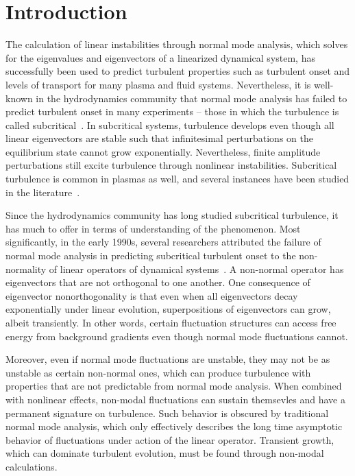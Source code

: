 \documentclass[twocolumn,showkeys,superscriptaddress]{revtex4}
\begin{document}
\section{Introduction}

The calculation of linear instabilities through normal mode analysis, which solves for the eigenvalues and eigenvectors of a linearized dynamical system,
has successfully been used to predict turbulent properties such as turbulent onset and levels of transport for many plasma and fluid systems.
Nevertheless, it is well-known in the hydrodynamics community that normal mode analysis has failed to predict turbulent onset in many experiments -- those in which the
turbulence is called subcritical~\cite{drazin1981}. 
In subcritical systems, turbulence develops even though all linear eigenvectors are stable such that infinitesimal perturbations on the equilibrium state cannot grow exponentially. 
Nevertheless, finite amplitude perturbations still excite turbulence through nonlinear instabilities.
Subcritical turbulence is common in plasmas as well, and several instances have been studied in the literature~\cite{waltz1985,scott1990,nordman1993,biskamp1995,drake1995,itoh1996,camargo1998,krommes1999,camporeale2009,schekochihin2012,highcock2012}. 

Since the hydrodynamics community has long studied subcritical turbulence, it has much to offer in terms of understanding of the phenomenon. Most significantly,
in the early 1990s, several researchers attributed the failure of normal mode analysis in predicting subcritical turbulent onset to the non-normality of linear operators of
dynamical systems~\cite{gustavsson1991,butler1992,trefethen1993,reddy1993,henningson1994,schmid2007}. A non-normal operator has 
eigenvectors that are not orthogonal to one another. One consequence of eigenvector nonorthogonality is that even when all eigenvectors decay exponentially under linear evolution, 
superpositions of eigenvectors can grow, albeit transiently.
In other words, certain fluctuation structures can access free energy from background gradients even though normal mode fluctuations cannot.

Moreover, even if normal mode fluctuations are unstable, they may not be as unstable as certain non-normal ones, which can produce turbulence with properties that are not predictable
from normal mode analysis.
When combined with nonlinear effects, non-modal fluctuations can sustain themsevles and have a permanent signature on turbulence.
Such behavior is obscured by traditional normal mode analysis, which only effectively describes the long time asymptotic behavior of fluctuations under  
action of the linear operator. Transient growth, which can dominate turbulent evolution, must be found through non-modal calculations.
\end{document}
